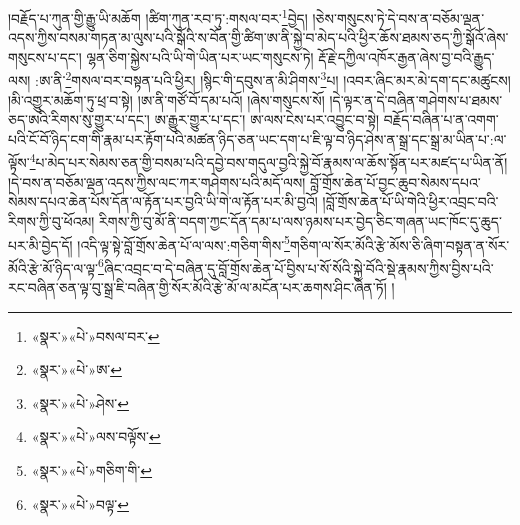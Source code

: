 །བརྗོད་པ་ཀུན་གྱི་རྒྱུ་ཡི་མཆོག །ཚིག་ཀུན་རབ་ཏུ་:གསལ་བར་\footnote{«སྣར་»«པེ་»བསལ་བར་}བྱེད། །ཅེས་གསུངས་ཏེ་དེ་བས་ན་བཅོམ་ལྡན་འདས་ཀྱིས་བསམ་གཏན་མ་ལུས་པའི་སྒོའི་ས་བོན་གྱི་ཚིག་ཨ་ནི་སྐྱེ་བ་མེད་པའི་ཕྱིར་ཆོས་ཐམས་ཅད་ཀྱི་སྒོའོ་ཞེས་གསུངས་པ་དང་། ལྷན་ཅིག་སྐྱེས་པའི་ཡི་གེ་ཡིན་པར་ཡང་གསུངས་ཏེ། རྡོ་རྗེ་དཀྱིལ་འཁོར་རྒྱན་ཞེས་བྱ་བའི་རྒྱུད་ལས། :ཨ་ནི་\footnote{«སྣར་»«པེ་»ཨ་}གསལ་བར་བསྟན་པའི་ཕྱིར། །སྙིང་གི་དབུས་ན་མི་ཤིགས་\footnote{«སྣར་»«པེ་»ཤེས་}པ། །འབར་ཞིང་མར་མེ་དག་དང་མཚུངས། །མི་འགྱུར་མཆོག་ཏུ་ཕྲ་བ་སྟེ། །ཨ་ནི་གཙོ་བོ་དམ་པའོ། །ཞེས་གསུངས་སོ། །དེ་ལྟར་ན་དེ་བཞིན་གཤེགས་པ་ཐམས་ཅད་ཨའི་རིགས་སུ་གྱུར་པ་དང་། ཨ་རྒྱུར་གྱུར་པ་དང་། ཨ་ལས་ངེས་པར་འབྱུང་བ་སྟེ། བརྗོད་བཞིན་པ་ན་འགག་པའི་ངོ་བོ་ཉིད་ངག་གི་རྣམ་པར་རྟོག་པའི་མཚན་ཉིད་ཅན་ཡང་དག་པ་ཇི་ལྟ་བ་ཉིད་ཤེས་ན་སྒྲ་དང་སྒྲ་མ་ཡིན་པ་:ལ་ལྟོས་\footnote{«སྣར་»«པེ་»ལས་བལྟོས་}པ་མེད་པར་སེམས་ཅན་གྱི་བསམ་པའི་དབྱེ་བས་གདུལ་བྱའི་སྐྱེ་བོ་རྣམས་ལ་ཆོས་སྟོན་པར་མཛད་པ་ཡིན་ནོ། །དེ་བས་ན་བཅོམ་ལྡན་འདས་ཀྱིས་ལང་ཀར་གཤེགས་པའི་མདོ་ལས། བློ་གྲོས་ཆེན་པོ་བྱང་ཆུབ་སེམས་དཔའ་སེམས་དཔའ་ཆེན་པོས་དོན་ལ་རྟོན་པར་བྱའི་ཡི་གེ་ལ་རྟོན་པར་མི་བྱའོ། །བློ་གྲོས་ཆེན་པོ་ཡི་གེའི་ཕྱིར་འབྲང་བའི་རིགས་ཀྱི་བུ་ཕོའམ། རིགས་ཀྱི་བུ་མོ་ནི་བདག་ཀྱང་དོན་དམ་པ་ལས་ཉམས་པར་བྱེད་ཅིང་གཞན་ཡང་ཁོང་དུ་ཆུད་པར་མི་བྱེད་དོ། །འདི་ལྟ་སྟེ་བློ་གྲོས་ཆེན་པོ་ལ་ལས་:གཅིག་གིས་\footnote{«སྣར་»«པེ་»གཅིག་གི་}གཅིག་ལ་སོར་མོའི་རྩེ་མོས་ཅི་ཞིག་བསྟན་ན་སོར་མོའི་རྩེ་མོ་ཉིད་ལ་ལྟ་\footnote{«སྣར་»«པེ་»བལྟ་}ཞིང་འབྲང་བ་དེ་བཞིན་དུ་བློ་གྲོས་ཆེན་པོ་བྱིས་པ་སོ་སོའི་སྐྱེ་བོའི་སྡེ་རྣམས་ཀྱིས་བྱིས་པའི་རང་བཞིན་ཅན་ལྟ་བུ་སྒྲ་ཇི་བཞིན་གྱི་སོར་མོའི་རྩེ་མོ་ལ་མངོན་པར་ཆགས་ཤིང་ཞེན་ཏོ། །
